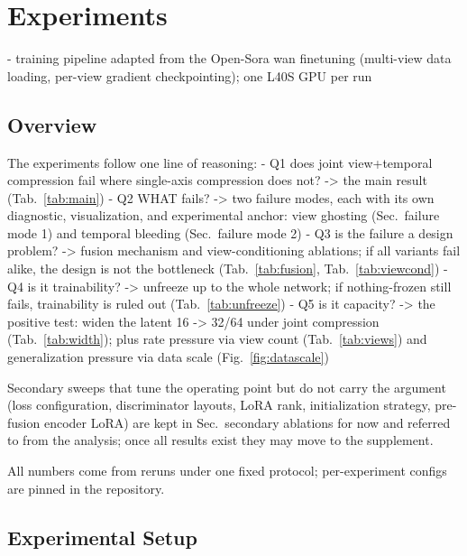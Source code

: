 

\section{Experiments}

- training pipeline adapted from the Open-Sora wan finetuning (multi-view data loading, per-view gradient checkpointing); one L40S GPU per run

\subsection{Overview}

The experiments follow one line of reasoning:
- Q1 does joint view+temporal compression fail where single-axis compression does not? -> the main result (Tab.~\ref{tab:main})
- Q2 WHAT fails? -> two failure modes, each with its own diagnostic, visualization, and experimental anchor: view ghosting (Sec.~failure mode 1) and temporal bleeding (Sec.~failure mode 2)
- Q3 is the failure a design problem? -> fusion mechanism and view-conditioning ablations; if all variants fail alike, the design is not the bottleneck (Tab.~\ref{tab:fusion}, Tab.~\ref{tab:viewcond})
- Q4 is it trainability? -> unfreeze up to the whole network; if nothing-frozen still fails, trainability is ruled out (Tab.~\ref{tab:unfreeze})
- Q5 is it capacity? -> the positive test: widen the latent 16 -> 32/64 under joint compression (Tab.~\ref{tab:width}); plus rate pressure via view count (Tab.~\ref{tab:views}) and generalization pressure via data scale (Fig.~\ref{fig:datascale})

Secondary sweeps that tune the operating point but do not carry the argument (loss configuration, discriminator layouts, LoRA rank, initialization strategy, pre-fusion encoder LoRA) are kept in Sec.~secondary ablations for now and referred to from the analysis; once all results exist they may move to the supplement.

All numbers come from reruns under one fixed protocol; per-experiment configs are pinned in the repository.

\subsection{Experimental Setup}

